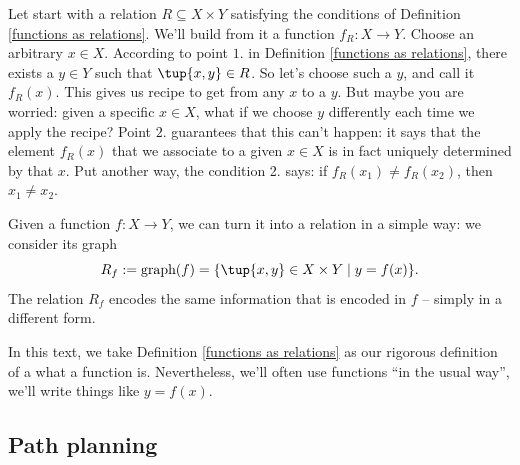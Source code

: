Let start with a relation $R \subseteq X \times Y$ satisfying the conditions of Definition \ref{functions as relations}.  We'll build from it a function $f_R : X \rightarrow Y$. Choose an arbitrary $x \in X$. According to point $1.$ in Definition \ref{functions as relations}, there exists a $y \in Y$ such that $\tup{x,y} \in R$. So let's choose such a $y$, and call it $f_R(x)$. This gives us recipe to get from any $x$ to a $y$. But maybe you are worried: given a specific $x \in X$, what if we choose $y$ differently each time we apply the recipe? Point $2.$ guarantees that this can't happen: it says that the element $f_R(x)$ that we associate to a given $x \in X$ is in fact uniquely determined by that $x$. Put another way, the condition 2. says: if $f_R(x_1) \neq f_R(x_2)$, then $x_1 \neq x_2$. 

Given a function $f : X \rightarrow Y$, we can turn it into a relation in a simple way: we consider its graph
$$
R_f := \text{graph}(f) = \{ \tup{x,y} \in X \times Y \mid y = f(x) \}. 
$$
The relation $R_f$ encodes the same information that is encoded in $f$ -- simply in a different form. 

In this text, we take Definition \ref{functions as relations} as our rigorous definition of a what a function is. Nevertheless, we'll often use functions ``in the usual way'',  we'll write things like $y = f(x)$. 

%
%
%
%
%
%
%
%
%

 
\subsection{Path planning}
\label{sec:trekking}



